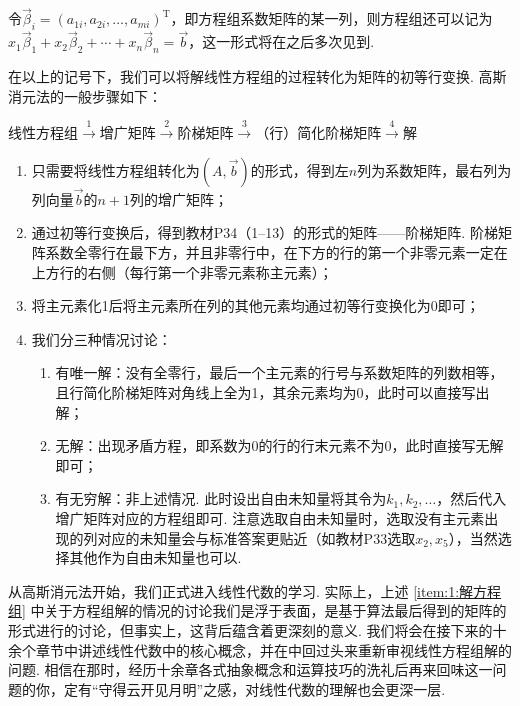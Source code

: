 令$\vec{\beta}_i=(a_{1i},a_{2i},\ldots,a_{mi})^\mathrm{T}$，即方程组系数矩阵的某一列，则方程组还可以记为$x_1\vec{\beta}_1+x_2\vec{\beta}_2+\cdots+x_n\vec{\beta}_n=\vec{b}$\label{线性方程的向量表示}，这一形式将在之后多次见到.

在以上的记号下，我们可以将解线性方程组的过程转化为矩阵的初等行变换. 高斯消元法的一般步骤如下：
\begin{center}
    线性方程组$\overset{1}{\longrightarrow}$增广矩阵$\overset{2}{\longrightarrow}$阶梯矩阵$\overset{3}{\longrightarrow}$（行）简化阶梯矩阵$\overset{4}{\longrightarrow}$解
\end{center}

\begin{enumerate}[label=步骤\arabic*~]
    \item 只需要将线性方程组转化为$(A, \vec{b})$的形式，得到左$n$列为系数矩阵，最右列为列向量$\vec{b}$的$n+1$列的增广矩阵；

    \item 通过初等行变换后，得到教材P34（1--13）的形式的矩阵——阶梯矩阵. 阶梯矩阵系数全零行在最下方，并且非零行中，在下方的行的第一个非零元素一定在上方行的右侧（每行第一个非零元素称主元素）；

    \item 将主元素化1后将主元素所在列的其他元素均通过初等行变换化为0即可；

    \item \label{item:1:解方程组}
          我们分三种情况讨论：
          \begin{enumerate}
              \item 有唯一解：没有全零行，最后一个主元素的行号与系数矩阵的列数相等，且行简化阶梯矩阵对角线上全为1，其余元素均为0，此时可以直接写出解；

              \item 无解：出现矛盾方程，即系数为0的行的行末元素不为0，此时直接写无解即可；

              \item 有无穷解：非上述情况. 此时设出自由未知量将其令为$k_1,k_2,\ldots$，然后代入增广矩阵对应的方程组即可. 注意选取自由未知量时，选取没有主元素出现的列对应的未知量会与标准答案更贴近（如教材P33选取$x_2,x_5$），当然选择其他作为自由未知量也可以.
          \end{enumerate}
\end{enumerate}

从高斯消元法开始，我们正式进入线性代数的学习. 实际上，上述 \ref*{item:1:解方程组} 中关于方程组解的情况的讨论我们是浮于表面，是基于算法最后得到的矩阵的形式进行的讨论，但事实上，这背后蕴含着更深刻的意义. 我们将会在接下来的十余个章节中讲述线性代数中的核心概念，并在中回过头来重新审视线性方程组解的问题. 相信在那时，经历十余章各式抽象概念和运算技巧的洗礼后再来回味这一问题的你，定有``守得云开见月明''之感，对线性代数的理解也会更深一层.

